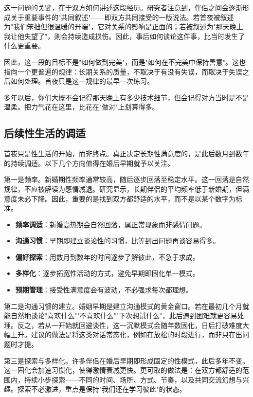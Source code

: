 \documentclass[12pt,UTF8]{ctexbook}
\newcommand{\keyword}[1]{\textbf{#1}}
\begin{document}
这一问题的关键，在于双方如何讲述这段经历。研究者注意到，伴侣之间会逐渐形成关于重要事件的"共同叙述"——即双方共同接受的一版说法。若首夜被叙述为"我们笨拙但很温暖的开端"，它对关系的影响是正面的；若被叙述为"那天晚上我让他失望了"，则会持续造成损伤。因此，事后如何谈论这件事，比当时发生了什么更重要。

因此，这一段的目标不是"如何做到完美"，而是"如何在不完美中保持善意"。这也指向一个更普遍的规律：长期关系的质量，不取决于有没有失误，而取决于失误之后如何处理。首夜只是这一规律的最早一次练习。

\begin{tcolorbox}[colback=pink!5!white,colframe=red!50!black,title=贴心小叮咛]
	多年以后，你们大概不会记得那天晚上有多少技术细节，但会记得对方当时是不是温柔。把力气花在这里，比花在"做对"上划算得多。
\end{tcolorbox}
\subsection{后续性生活的调适}

首夜只是性生活的开始，而非终点。真正决定长期性满意度的，是此后数月到数年的持续调适。以下几个方向值得在婚后早期就予以关注。

第一是频率。新婚期性频率通常较高，随后逐步回落至稳定水平。这一回落是自然规律，不应被解读为感情减退。研究显示，长期伴侣的平均频率低于新婚期，但满意度未必下降。因此，重要的是找到双方都舒适的水平，而不是以某个数字为标准。

\begin{itemize}
	\item \keyword{频率调适}：新婚高热期会自然回落，属正常现象而非感情问题。
	\item \keyword{沟通习惯}：早期即建立谈论性的习惯，比等到出问题再谈容易得多。
	\item \keyword{偏好探索}：用数月到数年的时间逐步了解彼此，不急于求成。
	\item \keyword{多样化}：逐步拓宽性活动的方式，避免早期即固化单一模式。
	\item \keyword{预期管理}：接受性满意度会有波动，不必强求每次都理想。
\end{itemize}

第二是沟通习惯的建立。婚姻早期是建立沟通模式的黄金窗口。若在最初几个月就能自然地谈论"喜欢什么""不喜欢什么""下次想试什么"，此后遇到困难就更容易处理。反之，若从一开始就回避谈性，这一沉默模式会随年数固化，日后打破难度大幅上升。建议的做法是将这类对话常态化，例如在放松的时段进行，而非只在出问题时才提。

第三是探索与多样化。许多伴侣在婚后早期即形成固定的性模式，此后多年不变。这一固化会加速习惯化，使得激情衰减更快。更可取的做法是：在双方都舒适的范围内，持续小步探索——不同的时间、场所、方式、节奏，以及共同交流幻想与兴趣。探索不必激进，重点是保持"我们还在学习彼此"的状态。
\end{document}
